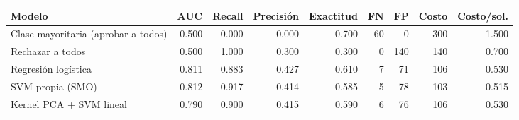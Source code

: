 \begin{tabular}{@{}lrrrrrrrr@{}}
\toprule
Modelo & AUC & Recall & Precisión & Exactitud & FN & FP & Costo & Costo/sol. \\
\midrule
Clase mayoritaria (aprobar a todos) & \num{0.500} & \num{0.000} & \num{0.000} & \num{0.700} & \num{60} & \num{0} & \num{300} & \num{1.500} \\
Rechazar a todos & \num{0.500} & \num{1.000} & \num{0.300} & \num{0.300} & \num{0} & \num{140} & \num{140} & \num{0.700} \\
Regresión logística & \num{0.811} & \num{0.883} & \num{0.427} & \num{0.610} & \num{7} & \num{71} & \num{106} & \num{0.530} \\
SVM propia (SMO) & \num{0.812} & \num{0.917} & \num{0.414} & \num{0.585} & \num{5} & \num{78} & \num{103} & \num{0.515} \\
Kernel PCA + SVM lineal & \num{0.790} & \num{0.900} & \num{0.415} & \num{0.590} & \num{6} & \num{76} & \num{106} & \num{0.530} \\
\bottomrule
\end{tabular}
